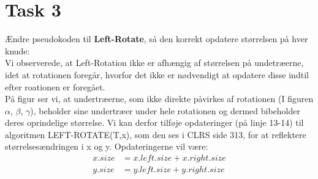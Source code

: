 \section{Task 3}

Ændre pseudokoden til \textbf{Left-Rotate}, så den korrekt opdatere størrelsen på hver knude:\\

Vi observerede, at Left-Rotation ikke er afhængig af størrelsen på undetræerne, idet at rotationen foregår, hvorfor det ikke er nødvendigt at opdatere disse indtil efter roationen er foregået.\\
På figur  ser vi, at undertræerne, som ikke direkte påvirkes af rotationen (I figuren $\alpha$, $\beta$, $\gamma$), beholder sine undertræer under hele rotationen og dermed bibeholder deres oprindelige størrelse.
Vi kan derfor tilføje opdateringer (på linje 13-14) til algoritmen LEFT-ROTATE(T,x), som den ses i CLRS side 313, for at reflektere størrelsesændringen i x og y. Opdateringerne vil være:
\begin{align*}
  x.size &= x.left.size + x.right.size\\
  y.size &= y.left.size + y.right.size
\end{align*}
